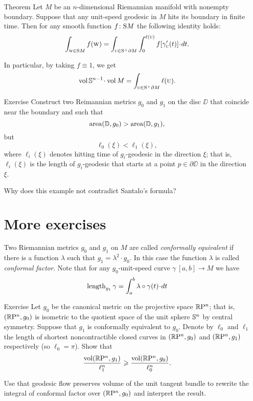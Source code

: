 \begin{thm}{Theorem}
Let $M$ be an $n$-dimensional Riemannian manifold with nonempty boundary.
Suppose that any unit-speed geodesic in $M$ hits its boundary in finite time.
Then for any smooth function $f\:\S M$ the following identity holds:
\[\int_{\vec w\in \S M}f(\vec w)
=
\int_{\vec u\in \S^+ \partial M} 
\int_0^{\ell(\vec u)} f[\gamma'_{\vec u}(t)]\cdot dt.\]

In particular, by taking $f\equiv 1$, we get
\[\vol\SSS^{n-1}\cdot\vol M=\int_{\vec u\in \S^+ \partial M} \ell(\vec u).\]

\end{thm}

\begin{thm}{Exercise}
Construct two Reimannian metrics $g_0$ and $g_1$ on the disc $\DD$ that coincide near the boundary and such that 
\[\area (\DD,g_0)>\area (\DD,g_1),\]
but 
\[\ell_0(\xi)<\ell_1(\xi),\]
where $\ell_i(\xi)$ denotes hitting time of $g_i$-geodesic in the direction $\xi$;
that is, 
$\ell_i(\xi)$ is the length of $g_i$-geodesic that starts at a point $p\in \partial \DD$ in the direction $\xi$.

Why does this example  not contradict Santalo's formula?
\end{thm}

\section{More exercises}

Two Riemannian metrics $g_0$ and $g_1$ on $M$ are called \emph{conformally equivalent} if there is a function $\lambda$ such that $g_1=\lambda^2\cdot g_0$.
In this case the function $\lambda$ is called \emph{conformal factor}.
Note that for any $g_0$-unit-speed curve $\gamma\:[a,b]\to M$ 
we have
\[\length_{g_1}\gamma=\int_a^b\lambda\circ\gamma(t)\cdot dt\]

\begin{thm}{Exercise}
Let $g_0$ be the canonical metric on the projective space $\RP^n$; 
that is, $(\RP^n,g_0)$ is isometric to the quotient space of the unit sphere $\SSS^n$ by central symmetry.
Suppose that $g_1$ is conformally equivalent to $g_0$.
Denote by $\ell_0$ and $\ell_1$ the length of shortest noncontractible closed curves in $(\RP^n,g_0)$ and $(\RP^n,g_1)$ respectively (so $\ell_0=\pi$).
Show that 
\[\frac{\vol(\RP^n,g_1)}{\ell_1^n}\ge \frac{\vol(\RP^n,g_0)}{\ell_0^n}.\]
\end{thm}

 Use that geodesic flow preserves volume of the unit tangent bundle to rewrite the integral of conformal factor over $(\RP^n,g_0)$ and interpret the result.

